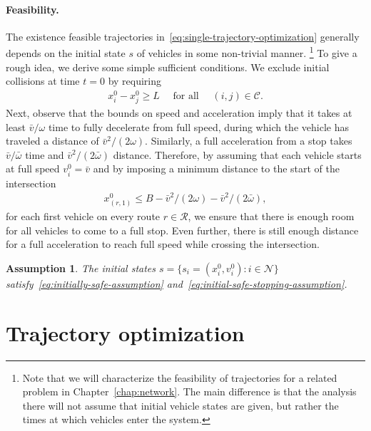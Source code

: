 \documentclass[a4paper]{report}
\theoremstyle{definition}
\theoremstyle{plain}
\newtheorem{assump}{Assumption}[chapter]
\begin{document}
\paragraph{Feasibility.}
The existence feasible trajectories in~\eqref{eq:single-trajectory-optimization} generally depends on the initial
state $s$ of vehicles in some non-trivial manner.%
\footnote{Note that we will characterize the feasibility of
  trajectories for a related problem in Chapter~\ref{chap:network}.
%
  The main difference is that the analysis there will not assume that initial
  vehicle states are given, but rather the times at which vehicles enter the
  system.}
%
To give a rough idea, we derive some simple sufficient conditions.
We exclude initial collisions at time $t=0$ by requiring
\begin{align}\label{eq:initially-safe-assumption}
 x_{i}^{0} - x_{j}^{0} \geq L \quad \text{ for all } \quad  (i,j) \in \mathcal{C} .
\end{align}
%
%
Next, observe that the bounds on speed and acceleration imply that it takes at
least $\bar{v}/\omega$ time to fully decelerate from full speed, during which the
vehicle has traveled a distance of $\bar{v}^2/(2\omega)$. Similarly, a full
acceleration from a stop takes $\bar{v}/\bar{\omega}$ time and
$\bar{v}^2/(2\bar{\omega})$ distance.
%
Therefore, by assuming that each vehicle starts at full speed
$v_{i}^{0} = \bar{v}$ and by imposing a minimum distance to the start of the
intersection
\begin{align}\label{eq:initial-safe-stopping-assumption}
  x_{(r,1)}^{0} \leq B - \bar{v}^2/(2\omega) - \bar{v}^2/(2\bar{\omega}),
\end{align}
for each first vehicle on every route
$r \in \mathcal{R}$, we ensure that there is enough room for all vehicles to
come to a full stop. Even further, there is still enough distance for a full
acceleration to reach full speed while crossing the intersection.
%

\begin{assump}\label{assump:feasible}
  The initial states $s=\{s_i = (x_i^0,v_i^0) : i \in \mathcal{N} \}$
  satisfy~\eqref{eq:initially-safe-assumption}
  and~\eqref{eq:initial-safe-stopping-assumption}.
\end{assump}


\pagebreak
\section{Trajectory optimization}
\end{document}
